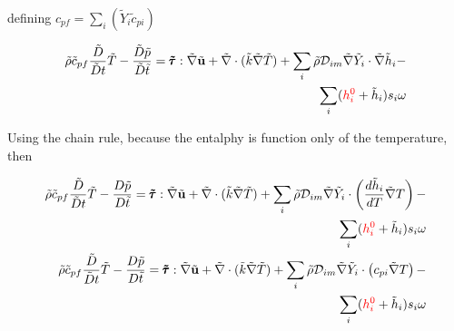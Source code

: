 \documentclass[preprint,12pt,authoryear]{elsarticle}
\begin{document}
defining 
$
{c}_{pf}
=
\sum\limits_i
\left(
        \tilde{Y}_i
        \tilde{c}_{pi}
\right)
$

\begin{equation}
\begin{split}
        \tilde{\rho}
        \tilde{c}_{pf}
        \frac{\tilde{D}}{\tilde{D} t}
        \tilde{T}
        -
        \frac{\tilde{D} \tilde{p}}{\tilde{D}\tilde{t}}
        =
        \pmb{\tilde{\tau}}:\tilde{\nabla} \tilde{\mathbf{u}} 
        + 
        \tilde{\nabla} \cdot (\tilde{k}\tilde{\nabla} \tilde{T})
        +
        \sum\limits_i 
        \tilde{\rho}
        \mathcal{D}_{im}
        \tilde{\nabla}
        \tilde{Y}_i     
        \cdot
        \tilde{\nabla} 
        \tilde{h}_i
	-
\\
        \sum\limits_i
        ({\color{red} h_i^0} + \tilde{h}_i)
        s_i	
        \omega
\end{split}
\end{equation}

Using the chain rule, because the entalphy is function only of the temperature, then 

\begin{equation}
\begin{split}
        \tilde{\rho}
        \tilde{c}_{pf}
        \frac{\tilde{D}}{\tilde{D} t}
        \tilde{T}
        -
        \frac{D \tilde{p}}{D\tilde{t}}
        =
        \pmb{\tilde{\tau}}:\tilde{\nabla} \tilde{\mathbf{u}} 
        + 
        \tilde{\nabla} \cdot (\tilde{k}\tilde{\nabla} \tilde{T})
        +
        \sum\limits_i 
        \tilde{\rho}
        \mathcal{D}_{im}
        \tilde{\nabla}
        \tilde{Y}_i     
        \cdot
        \left(
        \frac{d \tilde{h}_i}{ d T}
        \tilde{\nabla}T 
        \right)
        	-
\\
        \sum\limits_i
        ({\color{red} h_i^0} + \tilde{h}_i)
        s_i	
        \omega
\\
        \tilde{\rho}
        \tilde{c}_{pf}
        \frac{\tilde{D}}{\tilde{D} t}
        \tilde{T}
        -
        \frac{D \tilde{p}}{D\tilde{t}}
        =
        \pmb{\tilde{\tau}}:\tilde{\nabla} \tilde{\mathbf{u}} 
        + 
        \tilde{\nabla} \cdot (\tilde{k}\tilde{\nabla} \tilde{T})
        +
        \sum\limits_i 
        \tilde{\rho}
        \mathcal{D}_{im}
        \tilde{\nabla}
        \tilde{Y}_i     
        \cdot
        \left(
        c_{pi}
        \tilde{\nabla}T 
        \right)
	-
\\	
        \sum\limits_i
        ({\color{red} h_i^0} + \tilde{h}_i)
        s_i	
        \omega
%      
\end{split}
\end{equation}
\end{document}
